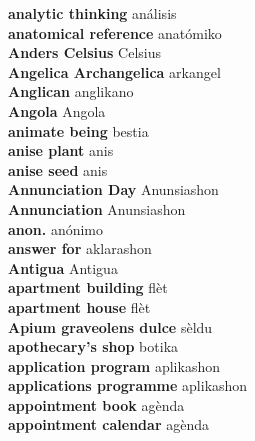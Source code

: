 \textbf{ analytic thinking  } análisis \\
\textbf{ anatomical reference  } anatómiko \\
\textbf{ Anders Celsius  } Celsius \\
\textbf{ Angelica Archangelica  } arkangel \\
\textbf{ Anglican  } anglikano \\
\textbf{ Angola  } Angola \\
\textbf{ animate being  } bestia \\
\textbf{ anise plant  } anis \\
\textbf{ anise seed  } anis \\
\textbf{ Annunciation Day  } Anunsiashon \\
\textbf{ Annunciation  } Anunsiashon \\
\textbf{ anon.  } anónimo \\
\textbf{ answer for  } aklarashon \\
\textbf{ Antigua  } Antigua \\
\textbf{ apartment building  } flèt \\
\textbf{ apartment house  } flèt \\
\textbf{ Apium graveolens dulce  } sèldu \\
\textbf{ apothecary’s shop  } botika \\
\textbf{ application program  } aplikashon \\
\textbf{ applications programme  } aplikashon \\
\textbf{ appointment book  } agènda \\
\textbf{ appointment calendar  } agènda \\
